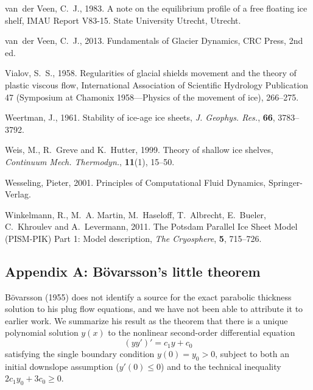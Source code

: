 \documentclass[twocolumn]{igs}
\renewcommand{\dh}{\fontencoding{T1}\selectfont{\symbol{240}}}
\newcommand{\bod}{B\"o\dh varsson\xspace}
\newcommand{\citebod}{B\"o\dh varsson (1955)\nocite{Bodvardsson}\xspace}
\begin{document}
\begin{thebibliography}{29}
van~der Veen, C.~J., 1983. A note on the equilibrium profile of a free floating
  ice shelf, {IMAU} Report V83-15. State University Utrecht, Utrecht.

van~der Veen, C.~J., 2013. Fundamentals of {G}lacier {D}ynamics, CRC Press, 2nd
  ed.

Vialov, S.~S., 1958. Regularities of glacial shields movement and the theory of
  plastic viscous flow, International Association of Scientific Hydrology
  Publication 47 (Symposium at Chamonix 1958---Physics of the movement of ice),
  266--275.

Weertman, J., 1961. Stability of ice-age ice sheets, {\em J. Geophys. Res.\/},
  {\bf 66}, 3783--3792.

Weis, M., R.~Greve and K.~Hutter, 1999. Theory of shallow ice shelves, {\em
  Continuum Mech. Thermodyn.\/}, {\bf 11}(1), 15--50.

Wesseling, Pieter, 2001. Principles of {C}omputational {F}luid {D}ynamics,
  Springer-Verlag.

Winkelmann, R., M.~A. Martin, M.~Haseloff, T.~Albrecht, E.~Bueler, C.~Khroulev
  and A.~Levermann, 2011. The {P}otsdam {P}arallel {I}ce {S}heet {M}odel
  ({PISM-PIK}) {P}art 1: {M}odel description, {\em The Cryosphere\/}, {\bf 5},
  715--726.
\end{thebibliography}

\appendix

\subsection{Appendix A: \bod's little theorem}  \citebod does not identify a source for the exact parabolic thickness solution to his plug flow equations, and we have not been able to attribute it to earlier work.  We summarize his result as the theorem that there is a unique polynomial solution $y(x)$ to the nonlinear second-order differential equation
\begin{equation}
  (y y')' = c_1 y + c_0  \label{eq:abstractode}
\end{equation}
satisfying the single boundary condition $y(0) = y_0 > 0$, subject to both an initial downslope assumption ($y'(0) \le 0$) and to the technical inequality $2 c_1 y_0 + 3 c_0 \ge 0$.
\end{document}

